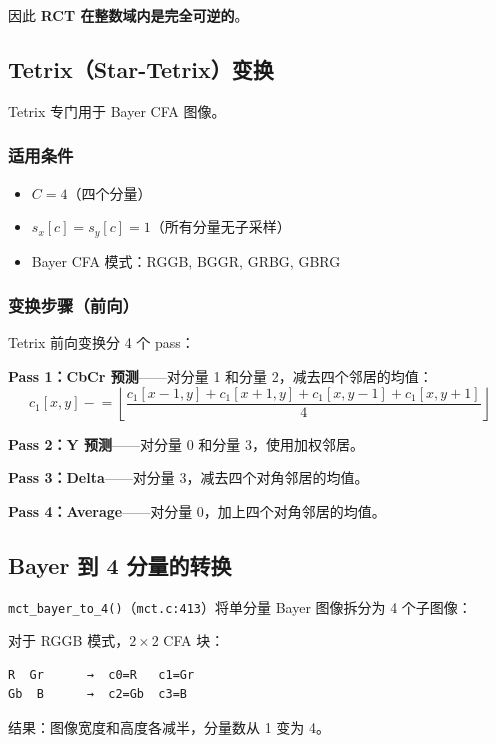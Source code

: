 因此 \textbf{RCT 在整数域内是完全可逆的}。

\subsection{Tetrix（Star-Tetrix）变换}

Tetrix 专门用于 Bayer CFA 图像。

\subsubsection{适用条件}

\begin{itemize}
  \item $C = 4$（四个分量）
  \item $s_x[c] = s_y[c] = 1$（所有分量无子采样）
  \item Bayer CFA 模式：RGGB, BGGR, GRBG, GBRG
\end{itemize}

\subsubsection{变换步骤（前向）}

Tetrix 前向变换分 4 个 pass：

\textbf{Pass 1：CbCr 预测}——对分量 1 和分量 2，减去四个邻居的均值：
\begin{equation}
c_1[x,y] \mathrel{-}= \left\lfloor \frac{c_1[x{-}1,y] + c_1[x{+}1,y] + c_1[x,y{-}1] + c_1[x,y{+}1]}{4} \right\rfloor
\end{equation}

\textbf{Pass 2：Y 预测}——对分量 0 和分量 3，使用加权邻居。

\textbf{Pass 3：Delta}——对分量 3，减去四个对角邻居的均值。

\textbf{Pass 4：Average}——对分量 0，加上四个对角邻居的均值。

\subsection{Bayer 到 4 分量的转换}

\texttt{mct\_bayer\_to\_4()}（\texttt{mct.c:413}）将单分量 Bayer 图像拆分为 4 个子图像：

对于 RGGB 模式，$2\times2$ CFA 块：
\begin{lstlisting}[numbers=none]
R  Gr      →  c0=R   c1=Gr
Gb  B      →  c2=Gb  c3=B
\end{lstlisting}

结果：图像宽度和高度各减半，分量数从 1 变为 4。

